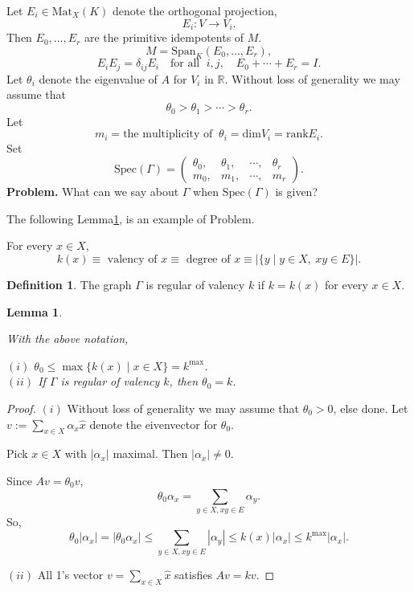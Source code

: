 \documentclass[
]{book}
\newtheorem{lemma}{Lemma}[chapter]
\theoremstyle{definition}
\newtheorem{definition}{Definition}[chapter]
\theoremstyle{definition}
\theoremstyle{definition}
\theoremstyle{definition}
\theoremstyle{remark}
\begin{document}
Let \(E_i\in\mathrm{Mat}_X(K)\) denote the orthogonal projection,
\[E_i: V \longrightarrow V_i.\]
Then \(E_0, \ldots, E_r\) are the primitive idempotents of \(M\).
\[M = \mathrm{Span}_K(E_0, \ldots, E_r),\]
\[E_iE_j = \delta_{ij}E_i \quad \textrm{for all }\; i, j, \quad E_0 + \cdots + E_r = I.\]
Let \(\theta_i\) denote the eigenvalue of \(A\) for \(V_i\) in \(\mathbb{R}\). Without loss of generality we may assume that
\[\theta_0 > \theta_1 > \cdots > \theta_r.\]
Let
\[m_i = \textrm{the multiplicity of }\: \theta_i = \mathrm{dim} V_i = \mathrm{rank} E_i.\]
Set
\[\mathrm{Spec}(\Gamma) = \begin{pmatrix} \theta_0, & \theta_1, & \cdots, & \theta_r\\m_0, & m_1, & \cdots, & m_r\end{pmatrix}.\]
\textbf{Problem. }
What can we say about \(\Gamma\) when \(\mathrm{Spec}(\Gamma)\) is given?

The following Lemma\ref{lem:largestev}, is an example of Problem.

For every \(x\in X\),
\[k(x) \equiv \textrm{ valency of }x \equiv \textrm{ degree of }x \equiv |\{y\mid y\in X, \: xy\in E\}|.\]

\begin{definition}
\protect\hypertarget{def:regular}{}\label{def:regular}The graph \(\Gamma\) is regular of valency \(k\) if \(k = k(x)\) for every \(x\in X\).
\end{definition}

\begin{lemma}
\protect\hypertarget{lem:largestev}{}\label{lem:largestev}

With the above notation,

\((i)\) \(\theta_0\leq \max\{k(x) \mid x\in X\} = k^{\max}\).\\
\((ii)\) If \(\Gamma\) is regular of valency \(k\), then \(\theta_0 = k\).

\end{lemma}

\begin{proof}
\leavevmode

\((i)\) Without loss of generality we may assume that \(\theta_0>0\), else done. Let \(v:=\sum_{x\in X}\alpha_x\hat{x}\) denote the eivenvector for \(\theta_0\).

Pick \(x\in X\) with \(|\alpha_x|\) maximal. Then \(|\alpha_x|\neq 0\).

Since \(Av = \theta_0v\),
\[\theta_0\alpha_x = \sum_{y\in X, xy\in E}\alpha_y.\]
So,
\[\theta_0 |\alpha_x| = |\theta_0\alpha_x| \leq \sum_{y\in X, xy\in E}|\alpha_y| \leq k(x)|\alpha_x| \leq k^{\max}|\alpha_x|.\]

\((ii)\) All 1's vector \(v = \sum_{x\in X}\hat{x}\) satisfies \(Av = kv\).

\end{proof}
\end{document}
